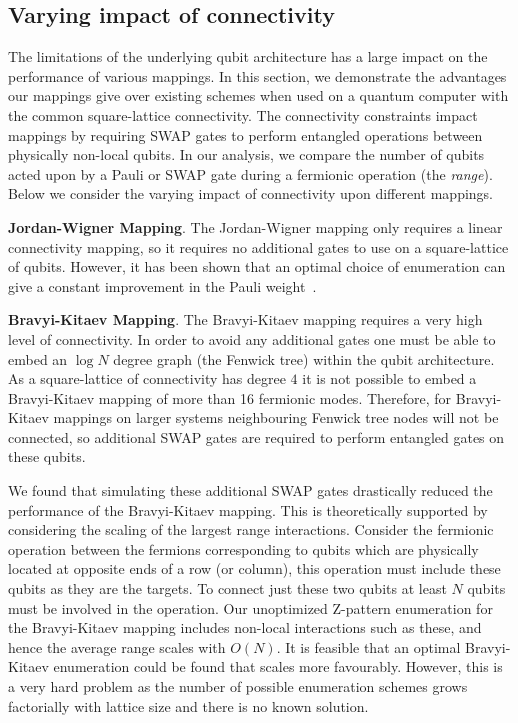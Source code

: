 \subsection{Varying impact of connectivity}
\label{section:connectivity}
The limitations of the underlying qubit architecture has a large impact on the performance of various mappings. In this section, we demonstrate the advantages our mappings give over existing schemes when used on a quantum computer with the common square-lattice connectivity. The connectivity constraints impact mappings by requiring SWAP gates to perform entangled operations between physically non-local qubits. In our analysis, we compare the number of qubits acted upon by a Pauli or SWAP gate during a fermionic operation (the \textit{range}). Below we consider the varying impact of connectivity upon different mappings.

\textbf {Jordan-Wigner Mapping}. The Jordan-Wigner mapping only requires a linear connectivity mapping, so it requires no additional gates to use on a square-lattice of qubits. However, it has been shown that an optimal choice of enumeration can give a constant improvement in the Pauli weight~\cite{chiew2021optimal}.

\textbf {Bravyi-Kitaev Mapping}.
The Bravyi-Kitaev mapping requires a very high level of connectivity. In order to avoid any additional gates one must be able to embed an $\log N$ degree graph (the Fenwick tree) within the qubit architecture. As a square-lattice of connectivity has degree $4$ it is not possible to embed a Bravyi-Kitaev mapping of more than 16 fermionic modes. Therefore, for Bravyi-Kitaev mappings on larger systems neighbouring Fenwick tree nodes will not be connected, so additional SWAP gates are required to perform entangled gates on these qubits.

We found that simulating these additional SWAP gates drastically reduced the performance of the Bravyi-Kitaev mapping. This is theoretically supported by considering the scaling of the largest range interactions. Consider the fermionic operation between the fermions corresponding to qubits which are physically located at opposite ends of a row (or column), this operation must include these qubits as they are the targets. To connect just these two qubits at least $N$ qubits must be involved in the operation. Our unoptimized Z-pattern enumeration for the Bravyi-Kitaev mapping includes non-local interactions such as these, and hence the average range scales with $O(N)$. It is feasible that an optimal Bravyi-Kitaev enumeration could be found that scales more favourably. However, this is a very hard problem as the number of possible enumeration schemes grows factorially with lattice size and there is no known solution.

